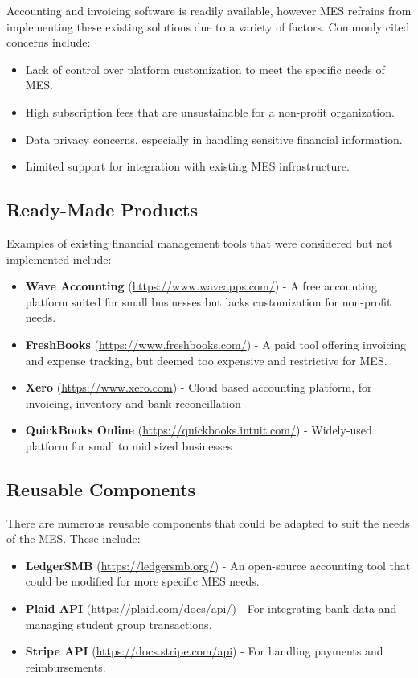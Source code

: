 \documentclass[12pt]{article}
\begin{document}
Accounting and invoicing software is readily available, however MES refrains from implementing these existing solutions due to a variety of factors. Commonly cited concerns include:
\begin{itemize}
    \item Lack of control over platform customization to meet the specific needs of MES.
    \item High subscription fees that are unsustainable for a non-profit organization.
    \item Data privacy concerns, especially in handling sensitive financial information.
    \item Limited support for integration with existing MES infrastructure.
\end{itemize}



\subsection{Ready-Made Products}

Examples of existing financial management tools that were considered but not implemented include:
\begin{itemize}
    \item \textbf{Wave Accounting} (\href{https://www.waveapps.com/}{https://www.waveapps.com/}) - A free accounting platform suited for small businesses but lacks customization for non-profit needs.
    \item \textbf{FreshBooks} (\href{https://www.freshbooks.com/}{https://www.freshbooks.com/}) - A paid tool offering invoicing and expense tracking, but deemed too expensive and restrictive for MES.
    \item \textbf{Xero} (\href{https://www.xero.com}{https://www.xero.com}) - Cloud based accounting platform, for invoicing, inventory and bank reconcillation
    \item \textbf{QuickBooks Online} (\href{https://quickbooks.intuit.com/}{https://quickbooks.intuit.com/}) - Widely-used platform for small to mid sized businesses

\end{itemize}
\subsection{Reusable Components}
There are numerous reusable components that could be adapted to suit the needs of the MES. These include:
\begin{itemize}
    \item \textbf{LedgerSMB} (\href{https://ledgersmb.org/}{https://ledgersmb.org/}) - An open-source accounting tool that could be modified for more specific MES needs.
    \item \textbf{Plaid API} (\href{https://plaid.com/docs/api/}{https://plaid.com/docs/api/}) - For integrating bank data and managing student group transactions.
    \item \textbf{Stripe API} (\href{https://docs.stripe.com/api}{https://docs.stripe.com/api}) - For handling payments and reimbursements.
\end{itemize}
\end{document}

